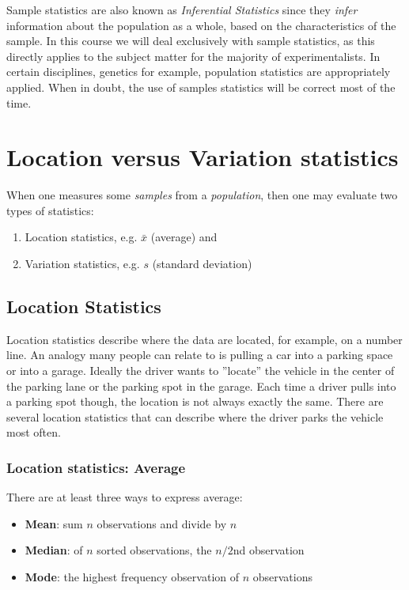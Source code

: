 Sample statistics are also known as \textsl{Inferential Statistics} since they \textsl{infer} information about the population as a whole, based on the characteristics of the sample.  In this course we will deal exclusively with sample statistics, as this directly applies to the subject matter for the majority of experimentalists.  In certain disciplines, genetics for example, population statistics are appropriately applied.  When in doubt, the use of samples statistics will be correct most of the time.

\section{Location versus Variation statistics}

When one measures some \textsl{samples} from a \textsl{population}, then one may evaluate two types of statistics:

\begin{enumerate}
\item Location statistics, e.g. $ \bar{x} $ (average) and 
\item Variation statistics, e.g. $ s $ (standard deviation) 
\end{enumerate}
\subsection{Location Statistics}

Location statistics describe where the data are located, for example, on a number line.  An analogy many people can relate to is pulling a car into a parking space or into a garage.  Ideally the driver wants to ''locate'' the vehicle in the center of the parking lane or the parking spot in the garage.  Each time a driver pulls into a parking spot though, the location is not always exactly the same. There are several location statistics that can describe where the driver parks the vehicle most often.

\subsubsection{Location statistics: Average}
 
 There are at least three ways to express average:
\begin{itemize}
  \item \textbf{Mean}:	sum $ n $ observations and divide by $ n $
  \item \textbf{Median}:	of $ n $ sorted observations, the $ n/2 $nd observation
  \item \textbf{Mode}:	the highest frequency observation of $ n $ observations
\end{itemize}


